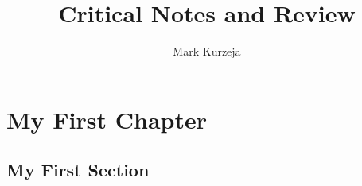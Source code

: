 \documentclass[10pt, letterpaper]{report}
\title{Critical Notes and Review}
\author{Mark Kurzeja}
\begin{document}
\maketitle
\chapter{My First Chapter}
\section{My First Section}
\end{document}
